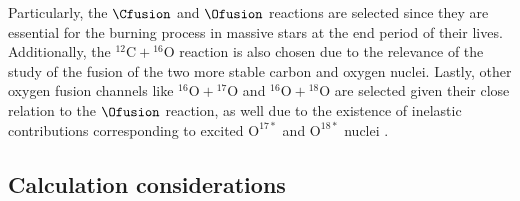 \documentclass[openany]{book}
\begin{document}
 Particularly, the $\Cfusion$  and $\Ofusion$ reactions are selected since they are essential for the burning process in massive stars at the end period of their lives. Additionally, the $\mathrm{{}^{12}C + {}^{16}O}$ reaction is also chosen due to the relevance of the study of the fusion of the two more stable carbon and oxygen nuclei. Lastly, other oxygen fusion channels like $\mathrm{{}^{16}O + {}^{17}O}$ and $\mathrm{{}^{16}O + {}^{18}O}$ are selected given their close relation to the $\Ofusion$ reaction, as well due to the existence of inelastic contributions corresponding to excited $\mathrm{O^{17*}}$ and $\mathrm{O^{18*}}$ nuclei \cite{thomas_chen_hinds_meredith_olson_1986}.   \\





 
 
 
\subsection{Calculation considerations} \label{sub:considerationsNonResonant}
\end{document}
